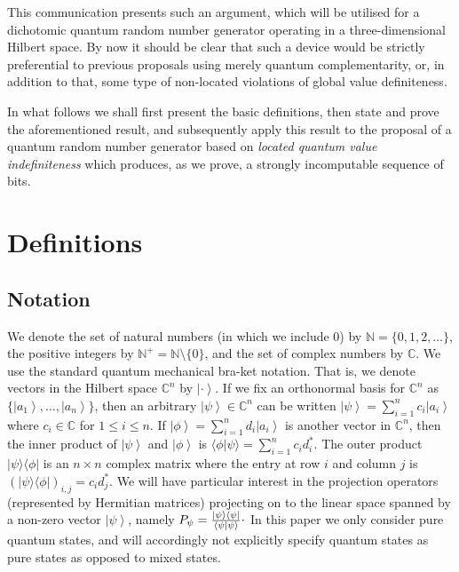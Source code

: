 \documentclass[%
 preprint,
 showpacs,
 showkeys,
 amsmath,
 amssymb,
 aps,
 pra,
 ]{revtex4-1}
\theoremstyle{definition}
\newcommand{\ket}[1]{\left| #1 \right>}
\newcommand{\iprod}[2]{\langle #1 | #2 \rangle}
\newcommand{\oprod}[2]{| #1 \rangle\langle #2 |}
\begin{document}
This communication presents such an argument, which will be utilised for a dichotomic quantum random number generator operating
in a three-dimensional Hilbert space.
By now it should be clear that such a device would be strictly preferential to previous proposals
using merely quantum complementarity, or, in addition to that, some type of non-located violations of global value definiteness.

In what follows we shall first present the basic definitions, then state and prove the aforementioned result,
and subsequently apply this result to
the proposal of a quantum random number generator based on {\em located quantum value indefiniteness} which produces, as we prove, a strongly incomputable sequence of bits.



\section{Definitions}%

\subsection{Notation}

We denote the set of natural numbers (in which we include 0) by $\mathbb{N}=\{0,1,2,\dots\}$, the positive integers by $\mathbb{N}^+=\mathbb{N}\setminus\{0\}$, and the set of complex numbers by $\mathbb{C}$.
We use the standard quantum mechanical bra-ket notation.
That is, we denote vectors in the Hilbert space $\mathbb{C}^n$ by $\ket{\cdot}$.
If we fix an orthonormal basis for $\mathbb{C}^n$ as $\{\ket{a_1},\dots,\ket{a_n}\}$, then an arbitrary $\ket{\psi}\in\mathbb{C}^n$ can be written $\ket{\psi}=\sum_{i=1}^n c_i\ket{a_i}$ where $c_i\in \mathbb{C}$ for $1\le i \le n$.
If $\ket{\phi}=\sum_{i=1}^n d_i\ket{a_i}$ is another vector in $\mathbb{C}^n$, then the inner product of $\ket{\psi}$ and $\ket{\phi}$ is $\iprod{\phi}{\psi}=\sum_{i=1}^n c_i d_i^*$.
The outer product $\oprod{\psi}{\phi}$ is an $n\times n$ complex  matrix where the entry at row $i$ and column $j$ is $(\oprod{\psi}{\phi})_{i,j}=c_i d_j^*$.
We will have particular interest in the projection operators (represented by Hermitian matrices) projecting on to the linear space spanned by a non-zero vector $\ket{\psi}$, namely $P_\psi = \frac{\oprod{\psi}{\psi}}{\iprod{\psi}{\psi}}\raisebox{.8mm}{.}$
In this paper we only consider pure quantum states, and will accordingly not explicitly specify quantum states as pure states as opposed to mixed states.
\end{document}

